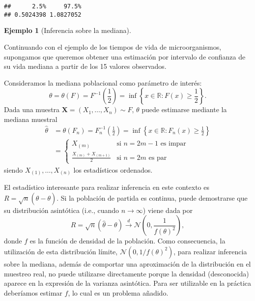 \documentclass[
]{book}
\theoremstyle{break}
\theoremstyle{definition}
\theoremstyle{definition}
\newtheorem{example}{Ejemplo}[chapter]
\theoremstyle{definition}
\theoremstyle{definition}
\theoremstyle{remark}
\begin{document}
\begin{verbatim}
##      2.5%     97.5% 
## 0.5024398 1.0827052
\end{verbatim}

\begin{example}[Inferencia sobre la mediana]
\protect\hypertarget{exm:mediana}{}{\label{exm:mediana} \iffalse (Inferencia sobre la mediana) \fi{} } \vspace{0.5cm}

Continuando con el ejemplo de los tiempos de vida de microorganismos,
supongamos que queremos obtener una estimación por intervalo de confianza
de su vida mediana a partir de los 15 valores observados.
\end{example}

Consideramos la mediana poblacional como parámetro de interés:
\[\theta = \theta \left( F \right) = F^{-1}\left( \frac{1}{2} \right) 
= \inf \left\{ x\in \mathbb{R} : F\left( x \right) \geq \frac{1}{2}\right\}.\]
Dada una muestra \(\mathbf{X}=\left( X_1,\ldots ,X_n \right) \sim F\), \(\theta\) puede estimarse mediante la mediana muestral
\[\begin{aligned}
\hat{\theta} &= \theta \left( F_n \right) =F_n^{-1}\left( \frac{1}{2} \right) 
=\inf \left\{ x\in \mathbb{R} : F_n\left( x \right) \geq \frac{1}{2}
\right\} \\
&= \left\{ 
\begin{array}{ll}
X_{(m)} & \text{si } n=2m-1 \text{ es impar} \\ 
\frac{X_{(m)}+X_{\left( m+1 \right)}}{2} & \text{si } n=2m \text{ es par}
\end{array}
\right.
\end{aligned}\]
siendo \(X_{(1)},\ldots ,X_{(n)}\) los estadísticos ordenados.

El estadístico interesante para realizar inferencia en este contexto es
\(R=\sqrt{n}\left( \hat{\theta}-\theta \right)\). Si la población de
partida es continua, puede demostrarse que su distribución asintótica
(i.e., cuando \(n \rightarrow \infty\)) viene dada por
\[R=\sqrt{n}\left( \hat{\theta}-\theta \right) \overset{d}{\rightarrow }
\mathcal{N}\left( 0,\frac{1}{f\left( \theta \right)^2} \right),\]donde \(f\) es
la función de densidad de la población. Como consecuencia, la
utilización de esta distribución límite,
\(\mathcal{N}\left( 0, 1/f\left( \theta \right)^2 \right)\), para realizar
inferencia sobre la mediana, además de comportar una aproximación de la
distribución en el muestreo real, no puede utilizarse directamente
porque la densidad (desconocida) aparece en la expresión de la varianza
asintótica. Para ser utilizable en la práctica deberíamos estimar \(f\),
lo cual es un problema añadido.
\end{document}
